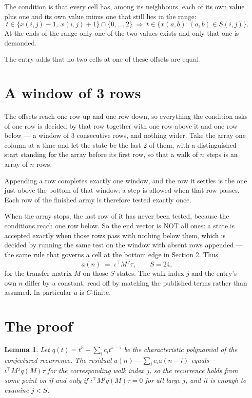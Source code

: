 \documentclass[11pt,a4paper]{article}
\theoremstyle{plain}
\newtheorem{lemma}[theorem]{Lemma}
\theoremstyle{definition}
\begin{document}
The condition is that every cell has, among its neighbours, each of its own value plus one and its own value minus one that still lies in the range:
\[
t\in\{x(i,j)-1,\ x(i,j)+1\}\cap\{0,\dots,2\}\ \Longrightarrow\ t\in\{x(a,b):(a,b)\in S(i,j)\}.
\]
At the ends of the range only one of the two values exists and only that one is demanded.

The entry adds that no two cells at one of these offsets are equal.

\section{A window of 3 rows}

The offsets reach one row up and one row down, so everything the condition asks of one row is
decided by that row together with one row above it and one row below --- a window of
$3$ consecutive rows, and nothing wider. Take the array one column at a time and
let the state be the last 2 of them, with a distinguished start standing for the array before its
first row, so that a walk of $n$ steps is an array of $n$ rows.

Appending a row completes exactly one window, and the row it settles is the one just above the bottom of that window; a step is
allowed when that row passes. Each row of the finished array is therefore tested exactly once.

When the array stops, the last row of it has never been tested, because the
conditions reach one row below. So the end vector is NOT all ones: a state is accepted exactly when
those rows pass with nothing below them, which is decided by running the same test on the window
with absent rows appended --- the same rule that governs a cell at the bottom edge in
Section 2.
Thus
\[
a(n)\;=\;\iota^{\!\top}M^{\,j}\tau ,\qquad S=24,
\]
for the transfer matrix $M$ on those $S$ states. The walk index $j$ and the entry's own $n$
differ by a constant, read off by matching the published terms rather than assumed. In
particular $a$ is $C$-finite.

\section{The proof}

\begin{lemma}\label{lem:crit}
Let $q(t)=t^{5}-\sum_i c_it^{5-i}$ be the characteristic polynomial of the
conjectured recurrence. The residual $a(n)-\sum_ic_ia(n-i)$ equals
$\iota^{\!\top}M^{\,j}q(M)\tau$ for the corresponding walk index $j$, so the recurrence
holds from some point on if and only if $\iota^{\!\top}M^{j}q(M)\tau=0$ for all large $j$,
and it is enough to examine $j<S$.
\end{lemma}
\end{document}

